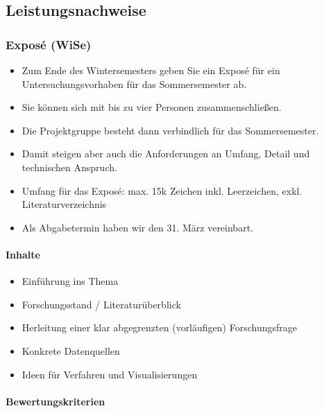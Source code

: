\documentclass[
  ngerman,
]{article}
\providecommand{\tightlist}{%
  \setlength{\itemsep}{0pt}\setlength{\parskip}{0pt}}
\begin{document}
\hypertarget{leistungsnachweise}{%
\subsection{Leistungsnachweise}\label{leistungsnachweise}}

\hypertarget{exposuxe9-wise}{%
\subsubsection{Exposé (WiSe)}\label{exposuxe9-wise}}

\begin{itemize}
\tightlist
\item
  Zum Ende des Wintersemesters geben Sie ein Exposé für ein Untersuchungsvorhaben für das Sommersemester ab.
\item
  Sie können sich mit bis zu vier Personen zusammenschließen.
\item
  Die Projektgruppe besteht dann verbindlich für das Sommersemester.
\item
  Damit steigen aber auch die Anforderungen an Umfang, Detail und technischen Anspruch.
\item
  Umfang für das Exposé: max. 15k Zeichen inkl. Leerzeichen, exkl. Literaturverzeichnis
\item
  Als Abgabetermin haben wir den 31. März vereinbart.
\end{itemize}

\hypertarget{inhalte}{%
\paragraph{Inhalte}\label{inhalte}}

\begin{itemize}
\tightlist
\item
  Einführung ins Thema
\item
  Forschungsstand / Literaturüberblick
\item
  Herleitung einer klar abgegrenzten (vorläufigen) Forschungsfrage
\item
  Konkrete Datenquellen
\item
  Ideen für Verfahren und Visualisierungen
\end{itemize}

\hypertarget{bewertungskriterien}{%
\paragraph{Bewertungskriterien}\label{bewertungskriterien}}
\end{document}
